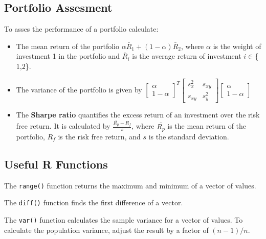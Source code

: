 \documentclass[
  letterpaper,
  DIV=11,
  numbers=noendperiod]{scrreprt}
\begin{document}
\hypertarget{portfolio-assesment}{%
\subsection*{Portfolio Assesment}\label{portfolio-assesment}}

To asses the performance of a portfolio calculate:

\begin{itemize}
\item
  The mean return of the portfolio
  \(\alpha\bar{R}_1+(1-\alpha)\bar{R}_2\), where \(\alpha\) is the
  weight of investment 1 in the portfolio and \(\bar{R}_i\) is the
  average return of investment \(i \in\)\{\(1\),\(2\)\}.
\item
  The variance of the portfolio is given by
  \(\begin{bmatrix} \alpha \\ 1-\alpha \end{bmatrix}^T \begin{bmatrix} s_x^2 & s_{xy} \\ s_{xy} & s_y^2 \end{bmatrix} \begin{bmatrix} \alpha \\ 1-\alpha \end{bmatrix}\)
\item
  The \textbf{Sharpe ratio} quantifies the excess return of an
  investment over the risk free return. It is calculated by
  \(\frac{\bar{R_p}-R_f}{s}\), where \(\bar{R_p}\) is the mean return of
  the portfolio, \(R_f\) is the risk free return, and \(s\) is the
  standard deviation.
\end{itemize}

\hypertarget{useful-r-functions-3}{%
\subsection*{Useful R Functions}\label{useful-r-functions-3}}

The \texttt{range()} function returns the maximum and minimum of a
vector of values.

The \texttt{diff()} function finds the first difference of a vector.

The \texttt{var()} function calculates the sample variance for a vector
of values. To calculate the population variance, adjust the result by a
factor of \((n-1)/n\).
\end{document}
